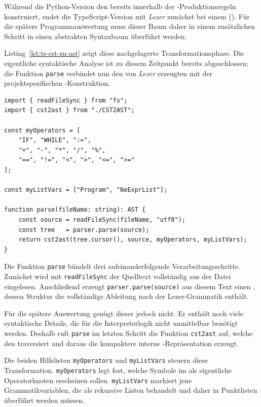 Während die Python-Version den  bereits innerhalb der -Produktionsregeln konstruiert, endet die TypeScript-Version mit \emph{Lezer} zunächst bei einem  (). Für die spätere Programmauswertung muss dieser Baum daher in einem zusätzlichen Schritt in einen abstrakten Syntaxbaum überführt werden.

Listing~\ref{lst:ts-cst-zu-ast} zeigt diese nachgelagerte Transformationsphase. Die eigentliche syntaktische Analyse ist zu diesem Zeitpunkt bereits abgeschlossen; die Funktion \texttt{parse} verbindet nun den von \emph{Lezer} erzeugten  mit der projektspezifischen -Konstruktion.

\begin{listing}[htbp]
\caption{CST-zu-AST-Transformation in TypeScript}
\label{lst:ts-cst-zu-ast}
\begin{verbatim}
import { readFileSync } from "fs";
import { cst2ast } from "./CST2AST";

const myOperators = [
    "IF", "WHILE", ":=",
    "+", "-", "*", "/", "%",
    "==", "!=", "<", ">", "<=", ">="
];

const myListVars = ["Program", "NeExprList"];

function parse(fileName: string): AST {
    const source = readFileSync(fileName, "utf8");
    const tree   = parser.parse(source);
    return cst2ast(tree.cursor(), source, myOperators, myListVars);
}
\end{verbatim}
\end{listing}

Die Funktion \texttt{parse} bündelt drei aufeinanderfolgende Verarbeitungsschritte. Zunächst wird mit \texttt{readFileSync} der Quelltext vollständig aus der Datei eingelesen. Anschließend erzeugt \texttt{parser.parse(source)} aus diesem Text einen , dessen Struktur die vollständige Ableitung nach der Lezer-Grammatik enthält.

Für die spätere Auswertung genügt dieser  jedoch nicht. Er enthält noch viele syntaktische Details, die für die Interpreterlogik nicht unmittelbar benötigt werden. Deshalb ruft \texttt{parse} im letzten Schritt die Funktion \texttt{cst2ast} auf, welche den  traversiert und daraus die kompaktere interne -Repräsentation erzeugt.

Die beiden Hilfslisten \texttt{myOperators} und \texttt{myListVars} steuern diese Transformation. \texttt{myOperators} legt fest, welche Symbole im  als eigentliche Operatorknoten erscheinen sollen. \texttt{myListVars} markiert jene Grammatikvariablen, die als rekursive Listen behandelt und daher in Punktlisten überführt werden müssen.


